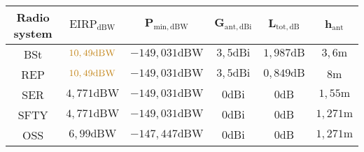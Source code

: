 \footnotesize
\begin{tabular}{|c|c|c|c|c|c|}
	\hline
	\textbf{Radio system} & $\boldsymbol{\mathrm{EIRP}_\mathrm{dBW}}$ & $\boldsymbol{P_\mathrm{min,dBW}}$ & $ \boldsymbol{G_\mathrm{ant,dBi}} $  & $\boldsymbol{L_\mathrm{tot,dB}}$ & $\boldsymbol{h_\mathrm{ant}}$ \\
	\hline
	BSt & $\color{rgb, 255:red, 196; green, 135; blue, 29 }10,49\mathrm{dBW}$ & $-149,031\mathrm{dBW}$ & $3,5\mathrm{dBi}$ & $1,987\mathrm{dB}$ & $3,6\mathrm{m}$ \\
	REP & $\color{rgb, 255:red, 196; green, 135; blue, 29 }10,49\mathrm{dBW}$ & $-149,031\mathrm{dBW}$ & $3,5\mathrm{dBi}$ & $0,849\mathrm{dB}$ & $8\mathrm{m}$ \\
	SER & $4,771\mathrm{dBW}$ & $-149,031\mathrm{dBW}$ & $0\mathrm{dBi}$ & $0\mathrm{dB}$ & $1,55\mathrm{m}$ \\
	SFTY & $4,771\mathrm{dBW}$  &  $-149,031\mathrm{dBW}$ & $0\mathrm{dBi}$ & $0\mathrm{dB}$ & $1,271\mathrm{m}$ \\
	OSS & $6,99\mathrm{dBW}$ & $-147,447\mathrm{dBW}$ & $0\mathrm{dBi}$ & $0\mathrm{dB}$ & $1,271\mathrm{m}$ \\
	\hline
\end{tabular}